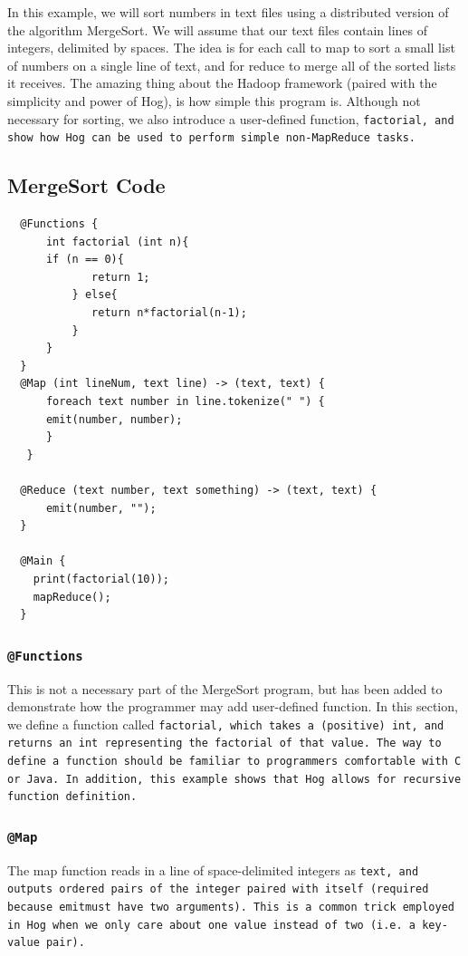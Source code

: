 \documentclass{report}
\begin{document}
In this example, we will sort numbers in text files using a distributed version of
the algorithm MergeSort. We will assume that our text files
contain lines of integers, delimited by spaces. The idea is for each call to map to
sort a small list of numbers on a single line of text, and for reduce to merge all
of the sorted lists it receives. The amazing thing about the Hadoop framework (paired with the simplicity and power of Hog), is how simple this program is. Although not necessary for sorting, we also introduce a user-defined function, \tt factorial\rm, and show how Hog can be used to perform simple non-MapReduce tasks.

\subsection{MergeSort Code}
\begin{verbatim}
  @Functions {
      int factorial (int n){
	  if (n == 0){
             return 1;
          } else{
             return n*factorial(n-1); 
          }
      }
  }
  @Map (int lineNum, text line) -> (text, text) {
      foreach text number in line.tokenize(" ") {
	  emit(number, number);
      }
   }

  @Reduce (text number, text something) -> (text, text) {
      emit(number, "");
  }
    
  @Main {
    print(factorial(10));
    mapReduce();
  }

\end{verbatim}

\subsubsection{\tt @Functions \rm}

This is not a necessary part of the MergeSort program, but has been added to demonstrate how the programmer may add user-defined function.
In this section, we define a function called \tt factorial\rm, which takes a (positive) \tt int\rm, 
and returns an \tt int \rm representing the factorial of that value. The way to define a function should be familiar to programmers
comfortable with C or Java. In addition, this example shows that Hog allows for recursive function definition.

\subsubsection{\tt @Map \rm} 

The map function reads in a line of space-delimited integers as \tt text\rm, and
outputs ordered pairs of the integer paired with itself (required because \tt emit\rm must have two arguments). This is a common trick employed in Hog
when we only care about one value instead of two (i.e. a key-value pair).
\end{document}
